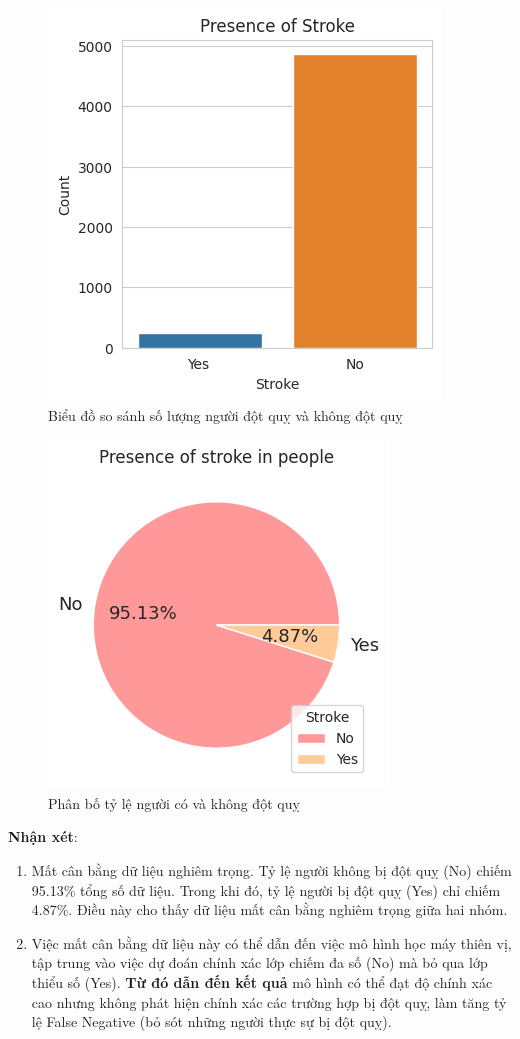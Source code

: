 \documentclass[11pt]{article}
\begin{document}
	\begin{figure}[H]
		\centering
		\includegraphics[width=0.5\linewidth]{dataBalanceCompare}
		\caption{Biểu đồ so sánh số lượng người đột quỵ và không đột quỵ}
		\label{fig:databalancecompare}
	\end{figure}
	
	\begin{figure}[H]
		\centering
		\includegraphics[width=0.5\linewidth]{compareBalancePie}
		\caption{Phân bố tỷ lệ người có và không đột quỵ}
		\label{fig:comparebalancepie}
	\end{figure}
	
	\textbf{Nhận xét}:
	\begin{enumerate}
		\item Mất cân bằng dữ liệu nghiêm trọng. Tỷ lệ người không bị đột quỵ (No) chiếm 95.13\% tổng số dữ liệu. Trong khi đó, tỷ lệ người bị đột quỵ (Yes) chỉ chiếm 4.87\%. Điều này cho thấy dữ liệu mất cân bằng nghiêm trọng giữa hai nhóm.
		\item Việc mất cân bằng dữ liệu này có thể dẫn đến việc mô hình học máy thiên vị, tập trung vào việc dự đoán chính xác lớp chiếm đa số (No) mà bỏ qua lớp thiểu số (Yes). \textbf{Từ đó dẫn đến kết quả} mô hình có thể đạt độ chính xác cao nhưng không phát hiện chính xác các trường hợp bị đột quỵ, làm tăng tỷ lệ False Negative (bỏ sót những người thực sự bị đột quỵ).
	\end{enumerate}
	
\end{document}
